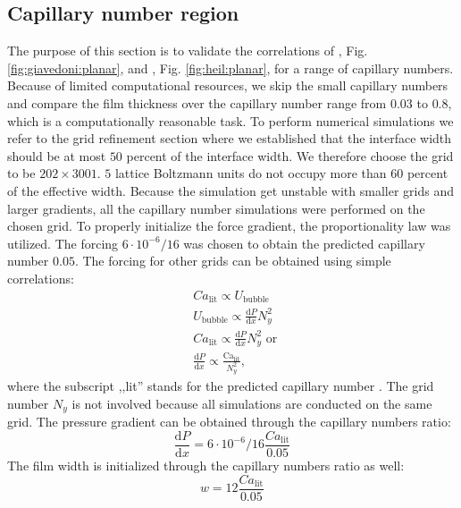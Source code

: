 \documentclass{article}
\newcommand{\Ca}{\mathrm{Ca}}
\begin{document}
\subsection{Capillary number region}
The purpose of this section is to validate the correlations of
\citet{giavedoni-numerical}, Fig. \ref{fig:giavedoni:planar}, and
\citet{heil-bretherton}, Fig. \ref{fig:heil:planar}, for a range of capillary
numbers. Because of limited computational resources, we skip the
small capillary numbers and compare the film thickness over the capillary number
range from $0.03$ to $0.8$, which is a computationally reasonable task.  
To perform numerical simulations we refer
to the grid refinement section where we established that the interface width should be
at most $50$ percent of the interface width.  We therefore choose the grid to be
$202 \times 3001$. $5$ lattice Boltzmann units do not occupy more than $60$
percent of the effective width. Because the simulation get unstable with
smaller grids and larger gradients, all the capillary number simulations were
performed on the chosen grid. To properly initialize the force gradient, the
proportionality law was utilized. The forcing
$6 \cdot 10^{-6}/16$ was chosen to obtain the predicted capillary
number $0.05$. The forcing for other grids can be obtained using
simple correlations:
\begin{equation}
\begin{aligned}
&Ca_{\mathrm{lit}} \propto U_{\mathrm{bubble}}\\
&U_{\mathrm{bubble}} \propto \frac{\mathrm{d}P}{\mathrm{d}x} N_y^2\\
&Ca_{\mathrm{lit}} \propto \frac{\mathrm{d}P}{\mathrm{d} x} N_y^2 \text{ or }\\
&\frac{\mathrm{d}P}{\mathrm{d} x} \propto \frac{\Ca_{\mathrm{lit}}}{N_y^2},
\end{aligned}
\end{equation}
where the subscript ,,lit'' stands for the predicted capillary number
\cite{giavedoni-numerical,heil-bretherton}. The grid number $N_y$ is not
involved because all simulations are conducted on the same grid.
The pressure gradient can be obtained through the capillary numbers
ratio:
\begin{equation}
\frac{\mathrm{d}P}{\mathrm{d} x}=6 \cdot 10^{-6}/16 \frac{Ca_{\mathrm{lit}}}{0.05}
\end{equation}
The film width is initialized through the capillary numbers ratio as well:
\begin{equation*}
w=12 \frac{Ca_{\mathrm{lit}}}{0.05}
\end{equation*}
\end{document}
